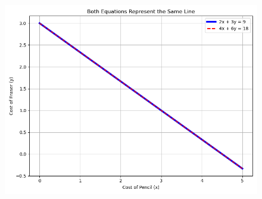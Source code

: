 \documentclass[journal]{IEEEtran}
\begin{document}
	\begin{figure}[H]
		\centering
		\includegraphics[width = 0.6\columnwidth]{Figure_2.png}
		\caption*{}
		\label{}
	\end{figure}
\end{document}
